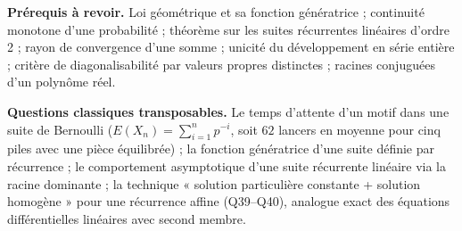 \documentclass[11pt,a4paper]{article}
\begin{document}
\textbf{Prérequis à revoir.} Loi géométrique et sa fonction génératrice ; continuité monotone d'une probabilité ; théorème sur les suites récurrentes linéaires d'ordre 2 ; rayon de convergence d'une somme ; unicité du développement en série entière ; critère de diagonalisabilité par valeurs propres distinctes ; racines conjuguées d'un polynôme réel.

\textbf{Questions classiques transposables.} Le temps d'attente d'un motif dans une suite de Bernoulli (\(E(X_n)=\sum_{i=1}^np^{-i}\), soit \(62\) lancers en moyenne pour cinq piles avec une pièce équilibrée) ; la fonction génératrice d'une suite définie par récurrence ; le comportement asymptotique d'une suite récurrente linéaire via la racine dominante ; la technique « solution particulière constante + solution homogène » pour une récurrence affine (Q39--Q40), analogue exact des équations différentielles linéaires avec second membre.
\end{document}
